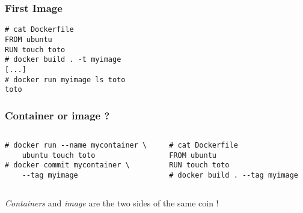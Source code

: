 \documentclass{beamer}
\begin{document}
\begin{frame}[fragile]
    \frametitle{First Image}
    \begin{verbatim}
# cat Dockerfile
FROM ubuntu
RUN touch toto
# docker build . -t myimage
[...]
# docker run myimage ls toto
toto
    \end{verbatim}
\end{frame}

\begin{frame}[fragile]
    \frametitle{Container or image ?}
    \begin{columns}
    \begin{column}{0.45\textwidth}
	\begin{verbatim}
# docker run --name mycontainer \
    ubuntu touch toto
# docker commit mycontainer \
    --tag myimage
	\end{verbatim}
    \end{column}
    \begin{column}{0.45\textwidth}
	\begin{verbatim}
# cat Dockerfile
FROM ubuntu
RUN touch toto
# docker build . --tag myimage
        \end{verbatim}
    \end{column}
    \end{columns}
    \vfill
    {\it Containers} and {\it image} are the two sides of the same coin !
    \vfill
\end{frame}
\end{document}

